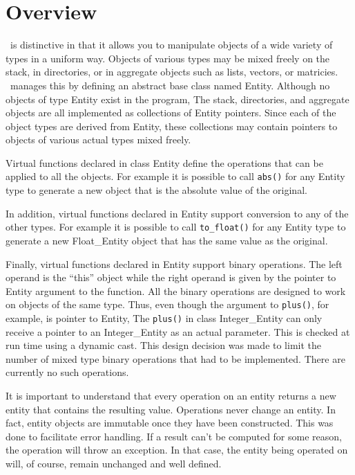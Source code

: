 \documentclass{report}
\begin{document}
\section{Overview}

\CLAC\ is distinctive in that it allows you to manipulate objects of a wide variety of types in
a uniform way. Objects of various types may be mixed freely on the stack, in directories, or in
aggregate objects such as lists, vectors, or matricies. \CLAC\ manages this by defining an
abstract base class named Entity. Although no objects of type Entity exist in the program, The
stack, directories, and aggregate objects are all implemented as collections of Entity pointers.
Since each of the object types are derived from Entity, these collections may contain pointers
to objects of various actual types mixed freely.

Virtual functions declared in class Entity define the operations that can be applied to all the
objects. For example it is possible to call \texttt{abs()} for any Entity type to generate a new
object that is the absolute value of the original.

In addition, virtual functions declared in Entity support conversion to any of the other types.
For example it is possible to call \texttt{to\_float()} for any Entity type to generate a new
Float\_Entity object that has the same value as the original.

Finally, virtual functions declared in Entity support binary operations. The left operand is the
``this'' object while the right operand is given by the pointer to Entity argument to the
function. All the binary operations are designed to work on objects of the same type. Thus, even
though the argument to \texttt{plus()}, for example, is pointer to Entity, The \texttt{plus()}
in class Integer\_Entity can only receive a pointer to an Integer\_Entity as an actual
parameter. This is checked at run time using a dynamic cast. This design decision was made to
limit the number of mixed type binary operations that had to be implemented. There are currently
no such operations.

It is important to understand that every operation on an entity returns a new entity that
contains the resulting value. Operations never change an entity. In fact, entity objects are
immutable once they have been constructed. This was done to facilitate error handling. If a
result can't be computed for some reason, the operation will throw an exception. In that case,
the entity being operated on will, of course, remain unchanged and well defined.
\end{document}
